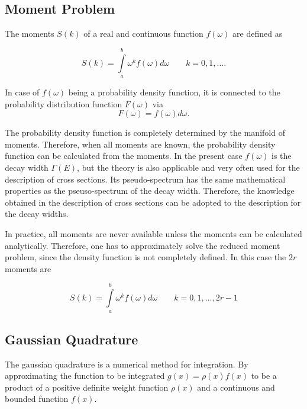 \subsection{Moment Problem}

The moments $S(k)$ of a real and continuous function $f(\omega)$ are defined
as

\begin{equation}
  S(k) = \int\limits_a^b \omega^k f(\omega) d\omega \quad\quad k=0,1,\dots  .
\end{equation}

In case of $f(\omega)$ being a probability density function, it is connected
to the probability distribution function $F(\omega)$ via
\begin{equation}
  F(\omega) = f(\omega){d\omega} .
\end{equation}

The probability density function is completely determined by the manifold
of moments. Therefore, when all moments are known, the probability density
function can be calculated from the moments. In the present case $f(\omega)$
is the decay width $\Gamma(E)$, but the theory is also applicable and very often
used for the description of cross sections. Its pseudo-spectrum has the same
mathematical properties as the pseuso-spectrum of the decay width. Therefore,
the knowledge obtained in the description of cross sections can be adopted to
the description for the decay widths.

In practice, all moments are never available unless the moments can be
calculated analytically. Therefore, one has to approximately solve the reduced
moment problem, since the density function is not completely defined.
In this case the $2r$ moments are

\begin{equation}
  S(k) = \int\limits_a^b \omega^k f(\omega) d\omega \quad\quad k=0,1,...,2r-1
\end{equation}





\subsection{Gaussian Quadrature}
The gaussian quadrature is a numerical method for integration. By approximating
the function to be integrated $g(x) = \rho(x) f(x)$ to be a product of a
positive definite weight
function $\rho (x)$ and a continuous and bounded function $f(x)$.

